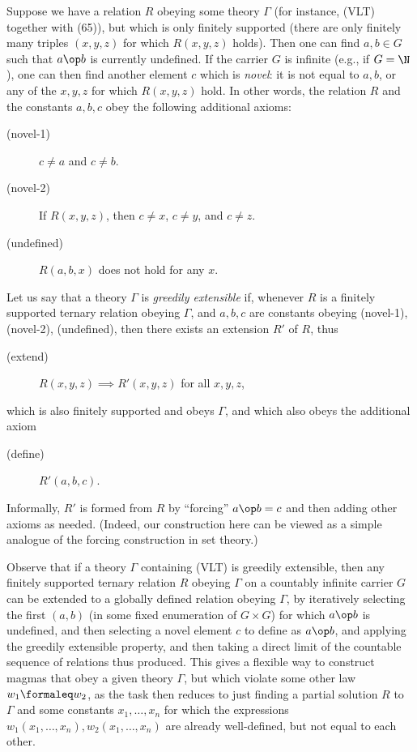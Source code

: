 Suppose we have a relation $R$ obeying some theory $\Gamma$ (for instance, (VLT) together with (65)), but which is only finitely supported (there are only finitely many triples $(x,y,z)$ for which $R(x,y,z)$ holds).  Then one can find $a,b \in G$ such that $a \op b$ is currently undefined.  If the carrier $G$ is infinite (e.g., if $G = \N$), one can then find another element $c$ which is \emph{novel}: it is not equal to $a, b$, or any of the $x,y,z$ for which $R(x,y,z)$ hold. In other words, the relation $R$ and the constants $a,b,c$ obey the following additional axioms:
\begin{description}
  \item[(novel-1)] $c \neq a$ and $c \neq b$.
  \item[(novel-2)] If $R(x,y,z)$, then $c \neq x$, $c \neq y$, and $c \neq z$.
  \item[(undefined)]  $R(a,b,x)$ does not hold for any $x$.
\end{description}

Let us say that a theory $\Gamma$ is \emph{greedily extensible} if, whenever $R$ is a finitely supported ternary relation obeying $\Gamma$, and $a,b,c$ are constants obeying (novel-1), (novel-2), (undefined), then there exists an extension $R'$ of $R$, thus
\begin{description}
  \item[(extend)] $R(x,y,z) \implies R'(x,y,z)$ for all $x,y,z$,
\end{description}
which is also finitely supported and obeys $\Gamma$, and which also obeys the additional axiom
\begin{description}
  \item[(define)] $R'(a,b,c)$.
\end{description}
Informally, $R'$ is formed from $R$ by ``forcing'' $a \op b = c$ and then adding other axioms as needed. (Indeed, our construction here can be viewed as a simple analogue of the forcing construction in set theory.)

Observe that if a theory $\Gamma$ containing (VLT) is greedily extensible, then any finitely supported ternary relation $R$ obeying $\Gamma$ on a countably infinite carrier $G$ can be extended to a globally defined relation obeying $\Gamma$, by iteratively selecting the first $(a,b)$ (in some fixed enumeration of $G \times G$) for which $a \op b$ is undefined, and then selecting a novel element $c$ to define as $a \op b$, and applying the greedily extensible property, and then taking a direct limit of the countable sequence of relations thus produced.  This gives a flexible way to construct magmas that obey a given theory $\Gamma$, but which violate some other law $w_1 \formaleq w_2$, as the task then reduces to just finding a partial solution $R$ to $\Gamma$ and some constants $x_1,\dots,x_n$ for which the expressions $w_1(x_1,\dots,x_n), w_2(x_1,\dots,x_n)$ are already well-defined, but not equal to each other.

